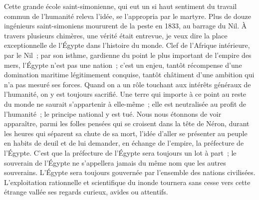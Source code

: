 \documentclass[french,twoside]{book} %
\newcommand\orgName[1]{#1}
\newcommand\persName[1]{#1}
\newcommand\placeName[1]{#1}
\begin{document}
Cette grande école saint-simonienne, qui eut un si haut sentiment du travail commun de l’humanité releva l’idée, se l’appropria par le martyre. Plus de douze ingénieurs saint-simoniens moururent de la peste en 1833, au barrage du {\placeName Nil}. À travers plusieurs chimères, une vérité était entrevue, je veux dire la place exceptionnelle de l’{\orgName Égypte} dans l’histoire du monde. Clef de l’{\orgName Afrique intérieure}, par le {\placeName Nil} ; par son isthme, gardienne du point le plus important de l’empire des mers, l’{\orgName Égypte} n’est pas une nation ; c’est un enjeu, tantôt récompense d’une domination maritime légitimement conquise, tantôt châtiment d’une ambition qui n’a pas mesuré ses forces. Quand on a un rôle touchant aux intérêts généraux de l’humanité, on y est toujours sacrifié. Une terre qui importe à ce point au reste du monde ne saurait s’appartenir à elle-même ; elle est neutralisée au profit de l’humanité ; le principe national y est tué. Nous nous étonnons de voir apparaître, parmi les folles pensées qui se croisent dans la tête de {\persName Néron}, durant les heures qui séparent sa chute de sa mort, l’idée d’aller se présenter au peuple en habits de deuil et de lui demander, en échange de l’empire, la préfecture de l’{\placeName Égypte}. C’est que la préfecture de l’{\placeName Égypte} sera toujours un lot à part ; le souverain de l’{\placeName Égypte} ne s’appellera jamais du même nom que les autres souverains. L’{\orgName Égypte} sera toujours gouvernée par l’ensemble des nations civilisées. L’exploitation rationnelle et scientifique du inonde tournera sans cesse vers cette étrange vallée ses regards curieux, avides ou attentifs.\par
\end{document}
